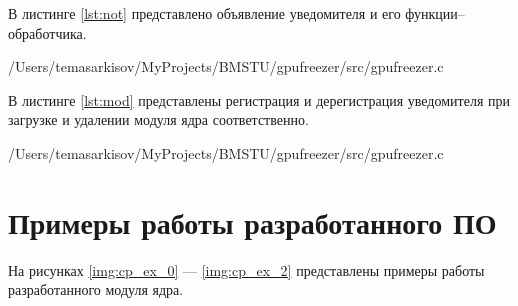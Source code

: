 В листинге \ref{lst:not} представлено объявление уведомителя и его функции--обработчика.

\begin{lstinputlisting}[
	caption={Уведомитель для USB--устройств},
	label={lst:not},
	style={c},
	linerange={180-202},
	]{/Users/temasarkisov/MyProjects/BMSTU/gpufreezer/src/gpufreezer.c}
\end{lstinputlisting}

В листинге \ref{lst:mod} представлены регистрация и дерегистрация уведомителя при загрузке и удалении модуля ядра соответственно.

\begin{lstinputlisting}[
	caption={Регистрация и дерегистрация уведомителя},
	label={lst:mod},
	style={c},
	linerange={204-217},
	]{/Users/temasarkisov/MyProjects/BMSTU/gpufreezer/src/gpufreezer.c}
\end{lstinputlisting}

\section{Примеры работы разработанного ПО}

На рисунках \ref{img:cp_ex_0} --- \ref{img:cp_ex_2} представлены примеры работы разработанного модуля ядра.



